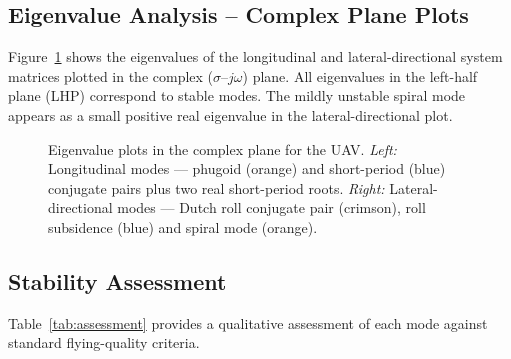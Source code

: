 \subsection{Eigenvalue Analysis – Complex Plane Plots}
\label{subsec:eigenvalue_plots}

Figure~\ref{fig:eigenvalue_plots} shows the eigenvalues of the longitudinal and lateral-directional system matrices plotted in the complex ($\sigma$--$j\omega$) plane. All eigenvalues in the left-half plane (LHP) correspond to stable modes. The mildly unstable spiral mode appears as a small positive real eigenvalue in the lateral-directional plot.

\begin{figure}[H]
  \centering
  \caption{Eigenvalue plots in the complex plane for the UAV. \textit{Left:} Longitudinal modes — phugoid (orange) and short-period (blue) conjugate pairs plus two real short-period roots. \textit{Right:} Lateral-directional modes — Dutch roll conjugate pair (crimson), roll subsidence (blue) and spiral mode (orange).}
  \label{fig:eigenvalue_plots}
\end{figure}

\subsection{Stability Assessment}
\label{subsec:assessment}

Table~\ref{tab:assessment} provides a qualitative assessment of each mode against standard flying-quality criteria.

